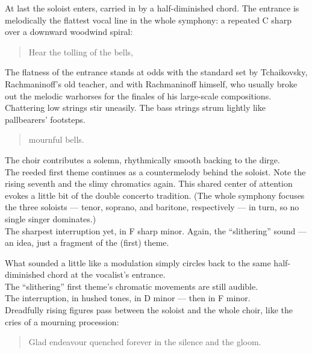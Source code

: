 \documentclass{beamer}
\begin{document}
\begin{frame}
  At last the soloist enters, carried in by a half-diminished chord. The entrance is melodically the flattest vocal line in the whole symphony: a repeated C sharp over a downward woodwind spiral: 
  \pause 
  \begin{quote} 
    Hear{\pause} the{\pause} toll{\pause}ing{\pause} of{\pause} the{\pause} bells,
  \end{quote} 
  \pause 
  The flatness of the entrance stands at odds with the standard set by Tchaikovsky, Rachmaninoff's old teacher, and with Rachmaninoff himself, who usually broke out the melodic warhorses for the finales of his large-scale compositions. 
  \pause \\ 
  Chattering low strings stir uneasily. The bass strings strum lightly like pallbearers' footsteps. 
  \pause 
  \begin{quote} 
    mourn{\pause}ful{\pause} bells. 
  \end{quote} 
\end{frame} 

\begin{frame} 
  The choir contributes a solemn, rhythmically smooth backing to the dirge.
  \pause \\ 
  The reeded first theme continues as a countermelody behind the soloist. Note the rising seventh and the slimy chromatics again. This shared center of attention evokes a little bit of the double concerto tradition. (The whole symphony focuses the three soloists --- tenor, soprano, and baritone, respectively --- in turn, so no single singer dominates.) 
  \pause \\ 
  The sharpest interruption yet, in F sharp minor. Again, the ``slithering'' sound --- an idea, just a fragment of the (first) theme. 
\end{frame} 

\begin{frame}
  What sounded a little like a modulation simply circles back to the same half-diminished chord at the vocalist's entrance. 
  \pause \\ 
  The ``slithering'' first theme's chromatic movements are still audible. 
  \pause \\ 
  The interruption, in hushed tones, in D minor --- \pause then in F minor. 
  \pause \\ 
  Dreadfully rising figures pass between the soloist and the whole choir, like the cries of a mourning procession: 
  \pause 
  \begin{quote} %
    Glad{\pause} en{\pause}dea{\pause}vour{\pause} quenched{\pause} for{\pause}e{\pause}ver{\pause} in{\pause} the{\pause} si{\pause}lence{\pause} and{\pause} the{\pause} gloom. 
  \end{quote} 
\end{frame} 
\end{document}
